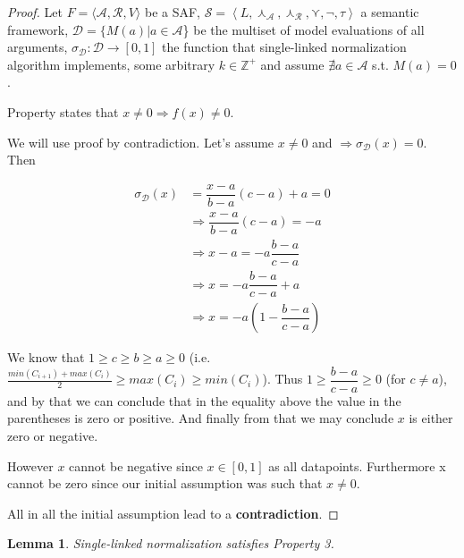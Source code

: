 \documentclass{article}
\newtheorem{lemma}{Lemma}
\newcommand{\real}{\mathbb{R}}  %
\newcommand{\args}{\mathcal{A}} %
\newcommand{\att}{\mathcal{R}}  %
\newcommand{\valueset}{L}
\newcommand{\safid}{F}               %
\newcommand{\saf}{\safid = \safbody} %
\newcommand{\safbody}{\langle \args, \att, V \rangle} %
\newcommand{\sembodyNew}{\left\langle \valueset,\SAFand_\mathcal{A}, \SAFand_\mathcal{R},\SAFor,\lnot,\tau \right\rangle} %
\newcommand{\SAFand}{\curlywedge}     %
\newcommand{\SAFor}{\curlyvee}        %
\newcommand{\sem}{\mathcal{S}}
\newcommand{\dataset}{\mathcal{D}}   %
\begin{document}
\begin{proof}
Let $\saf$ be a SAF, $\sem = \sembodyNew$ a semantic framework, $\dataset = \{M(a)|a \in \args$\} be the multiset of model evaluations of all arguments, $\sigma_{\dataset}: \dataset  \rightarrow  [0,1]$ the function that single-linked normalization algorithm implements, some arbitrary $k \in \mathbb{Z}^{+}$ and assume $\nexists a \in \args$ s.t. $M(a) = 0$. %

Property states that $x \neq 0 \Rightarrow f(x) \neq 0$. 

We will use proof by contradiction. Let's assume  $x \neq 0$ and $\Rightarrow \sigma_{\dataset}(x) = 0$. Then

\begin{align*}
  \sigma_{\dataset}(x) 
  &= \dfrac{x-a}{b-a} (c-a) + a = 0
  \\ &\Rightarrow  \dfrac{x-a}{b-a} (c-a) = -a    
  \\ &\Rightarrow  x - a= -a \dfrac{b-a}{c-a}  
  \\ &\Rightarrow  x = -a \dfrac{b-a}{c-a} + a
   \\ &\Rightarrow  x = -a   (1 -\dfrac{b-a}{c-a})                                              
\end{align*}

We know that $1 \geq c \geq b \geq a \geq 0$ (i.e. $\frac{min(C_{i+1})+max(C_i)}{2} \geq max(C_i) \geq min(C_i)$). Thus $1 \geq \dfrac{b-a}{c-a} \geq 0$  (for $c \neq a$), and by that we can conclude that in the equality above the value in the parentheses is zero or positive. And finally from that we may conclude $x$ is either zero or negative.

However $x$ cannot be negative since $x \in [0, 1]$ as all datapoints. Furthermore x cannot be zero since our initial assumption was such that  $x \neq 0$.

All in all the initial assumption lead to a \textbf{contradiction}.

\end{proof}

\begin{lemma}
Single-linked normalization satisfies Property 3.
\end{lemma}
\end{document}
